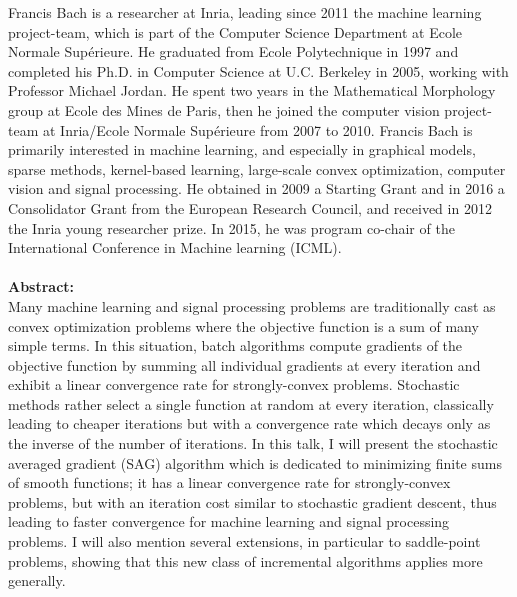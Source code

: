 Francis Bach is a researcher at Inria, leading since 2011 the machine learning project-team, which is part of the Computer Science Department at Ecole Normale Sup\'erieure. He graduated from Ecole Polytechnique in 1997 and completed his Ph.D. in Computer Science at U.C. Berkeley in 2005, working with Professor Michael Jordan. He spent two years in the Mathematical Morphology group at Ecole des Mines de Paris, then he joined the computer vision project-team at Inria/Ecole Normale Sup\'erieure from 2007 to 2010. Francis Bach is primarily interested in machine learning, and especially in graphical models, sparse methods, kernel-based learning, large-scale convex optimization, computer vision and signal processing. He obtained in 2009 a Starting Grant and in 2016 a Consolidator Grant from the European Research Council, and received in 2012 the Inria young researcher prize. In 2015, he was program co-chair of the International Conference in Machine learning (ICML).\\\\

\textbf{Abstract:}\\

Many machine learning and signal processing problems are traditionally cast as convex optimization problems where the objective function is a sum of many simple terms. In this situation, batch algorithms compute gradients of the objective function by summing all individual gradients at every iteration and exhibit a linear convergence rate for strongly-convex problems. Stochastic methods rather select a single function at random at every iteration, classically leading to cheaper iterations but with a convergence rate which decays only as the inverse of the number of iterations. In this talk, I will present the stochastic averaged gradient (SAG) algorithm which is dedicated to minimizing finite sums of smooth functions; it has a linear convergence rate for strongly-convex problems, but with an iteration cost similar to stochastic gradient descent, thus leading to faster convergence for machine learning and signal processing problems. I will also mention several extensions, in particular to saddle-point problems, showing that this new class of incremental algorithms applies more generally.




